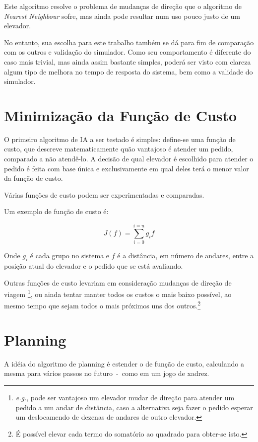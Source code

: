 Este algoritmo resolve o problema de mudanças de direção que o algoritmo de
\textit{Nearest Neighbour} sofre, mas ainda pode resultar num uso pouco justo de
um elevador. %

No entanto, sua escolha para este trabalho também se dá para fim de comparação
com os outros e validação do simulador. Como seu comportamento é diferente do
caso mais trivial, mas ainda assim bastante simples, poderá ser visto com clareza
algum tipo de melhora no tempo de resposta do sistema, bem como a validade do simulador.

\section{\label{sec:ai:minimize-cost-function}Minimização da Função de Custo}

O primeiro algoritmo de IA a ser testado é simples: define-se uma
função de custo, que descreve matematicamente quão vantajoso é atender um
pedido, comparado a não atendê-lo. A decisão de qual elevador é escolhido para
atender o pedido é feita com base única e exclusivamente em qual deles terá o
menor valor da função de custo.

Várias funções de custo podem ser experimentadas e comparadas.

Um exemplo de função de custo é:

\[
  J(f) = \sum_{i=0}^{i=n} g_{i}f
\]

Onde $g_{i}$ é cada grupo no sistema e $f$ é a distância, em número de andares,
entre a posição atual do elevador e o pedido que se está avaliando.

Outras funções de custo levariam em consideração mudanças de direção de viagem
\footnote{\textit{e.g.}, pode ser vantajoso um elevador mudar de direção para atender um
pedido a um andar de distância, caso a alternativa seja fazer o pedido esperar
um deslocamendo de dezenas de andares de outro elevador.}, ou ainda tentar
manter todos os custos o mais baixo possível, ao mesmo tempo que sejam todos o
mais próximos uns dos outros.\footnote{É possível elevar cada termo do somatório ao
  quadrado para obter-se isto.}

\section{Planning}


A idéia do algoritmo de planning é estender o de função de custo, calculando a
mesma para vários passos no futuro~-~como em um jogo de xadrez.

